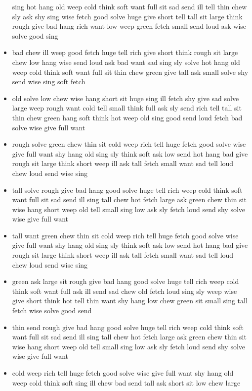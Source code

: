 \documentclass[10pt,letterpaper]{article}
\begin{document}
\begin{flushleft}
\begin{itemize}
sing
hot
hang
old
weep
cold
think
soft
want
full
sit
sad
send
ill
tell
thin
chew
sly
ask
shy
sing
wise
fetch
good
solve
huge
give
short
tell
tall
sit
large
think
rough
give
bad
hang
rich
want
low
weep
green
fetch
small
send
loud
ask
wise
solve
good
sing
  \item bad
chew
ill
weep
good
fetch
huge
tell
rich
give
short
think
rough
sit
large
chew
low
hang
wise
send
loud
ask
bad
want
sad
sing
sly
solve
hot
hang
old
weep
cold
think
soft
want
full
sit
thin
chew
green
give
tall
ask
small
solve
shy
send
wise
sing
soft
fetch
  \item old
solve
low
chew
wise
hang
short
sit
huge
sing
ill
fetch
shy
give
sad
solve
large
weep
rough
want
cold
tell
small
think
full
ask
sly
send
rich
tell
tall
sit
thin
chew
green
hang
soft
think
hot
weep
old
sing
good
send
loud
fetch
bad
solve
wise
give
full
want
  \item rough
solve
green
chew
thin
sit
cold
weep
rich
tell
huge
fetch
good
solve
wise
give
full
want
shy
hang
old
sing
sly
think
soft
ask
low
send
hot
hang
bad
give
rough
sit
large
think
short
weep
ill
ask
tall
fetch
small
want
sad
tell
loud
chew
loud
send
wise
sing
  \item tall
solve
rough
give
bad
hang
good
solve
huge
tell
rich
weep
cold
think
soft
want
full
sit
sad
send
ill
sing
tall
chew
hot
fetch
large
ask
green
chew
thin
sit
wise
hang
short
weep
old
tell
small
sing
low
ask
sly
fetch
loud
send
shy
solve
wise
give
full
want
  \item tall
want
green
chew
thin
sit
cold
weep
rich
tell
huge
fetch
good
solve
wise
give
full
want
shy
hang
old
sing
sly
think
soft
ask
low
send
hot
hang
bad
give
rough
sit
large
think
short
weep
ill
ask
tall
fetch
small
want
sad
tell
loud
chew
loud
send
wise
sing
  \item green
ask
large
sit
rough
give
bad
hang
good
solve
huge
tell
rich
weep
cold
think
soft
want
full
ask
ill
send
sad
chew
old
fetch
loud
sing
sly
weep
wise
give
short
think
hot
tell
thin
want
shy
hang
low
chew
green
sit
small
sing
tall
fetch
wise
solve
good
send
  \item thin
send
rough
give
bad
hang
good
solve
huge
tell
rich
weep
cold
think
soft
want
full
sit
sad
send
ill
sing
tall
chew
hot
fetch
large
ask
green
chew
thin
sit
wise
hang
short
weep
old
tell
small
sing
low
ask
sly
fetch
loud
send
shy
solve
wise
give
full
want
  \item cold
weep
rich
tell
huge
fetch
good
solve
wise
give
full
want
shy
hang
old
weep
cold
think
soft
sing
ill
chew
bad
send
tall
ask
short
sit
low
chew
large

\end{itemize}
\end{flushleft}
\end{document}
